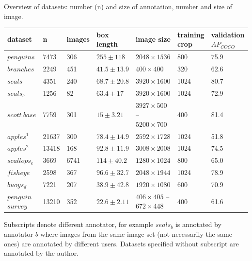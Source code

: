 \begin{threeparttable}[phtb]
\centering
\caption{Overview of datasets: number (n) and size of annotation, number and size of image.  } 
\label{tab:resolutions} 
\begin{tabular}{lllllll}
dataset & n & images & box length & image size & \shortstack{training \\ crop} & \shortstack{validation \\ $AP_{COCO}$} \\
\toprule
$penguins$        & 7473        & 306    & $255 \pm 118$   &  $2048\times1536$  & 800                                   & 75.9                   \\
$branches$        & 2249        & 451    & $41.5 \pm 13.9$ &  $400\times400$    & 320                                   & 62.6                   \\
$seals$           & 4351        & 240    & $68.7 \pm 20.8$ &  $3920\times1600$  & 1024                                    & 80.7                   \\
$seals_b$         & 1256        & 82     & $63.4 \pm 17$   & $3920\times1600$  & 1024                                                     & 72.9        \\
$scott\:base$     & 7759        & 301    & $15 \pm 3.21$     & \shortstack[l]{$3927\times500$ -- \\ $5200\times700$} & 400  & 81.4  \\
$apples^1$        & 21637       & 300    & $78.4 \pm 14.9$ &  $2592\times1728$ & 1024 & 51.8                   \\
$apples^2$        & 13418       & 168    & $92.8 \pm 11.9$ &  $3008\times2008$  & 1024                                    & 74.5                   \\
$scallops_e$      & 3669        & 6741   & $114 \pm 40.2$  &  $1280\times1024$  & 800                                   & 65.0                   \\
$fisheye$         & 2598        & 367    & $96.6 \pm 32.7$ &  $2048\times1944$ & 1024                                     & 78.9                   \\
$buoys_d$         & 7221        & 207    & $38.9 \pm 42.8$ &  $1920\times1080$ & 600                                    & 70.9                   \\
\shortstack{$penguin$ \\ $survey$} & 13210       & 352    & $22.6 \pm 2.11$ & \shortstack[l] {$406\times405$ -- \\ $672\times448$} & 400  & 61.6               \\ 
\bottomrule
\end{tabular}
\begin{tablenotes}
\small
\item Subscripts denote different annotator, for example $seals_b$ is annotated by annotator $b$ where images from the same image set (not necessarily the same ones) are annotated by different users.  Datasets specified without subscript are annotated by the author.
\end{tablenotes}
\end{threeparttable}


